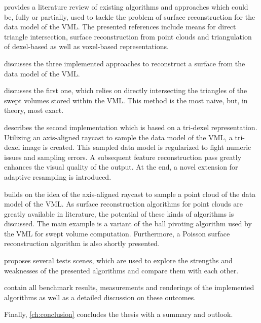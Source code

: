  provides a literature review of existing algorithms and approaches which could be, fully or partially, used to tackle the problem of surface reconstruction for the data model of the VML.
The presented references include means for direct triangle intersection, surface reconstruction from point clouds and triangulation of dexel-based as well as voxel-based representations.

 discusses the three implemented approaches to reconstruct a surface from the data model of the VML.

 discusses the first one, which relies on directly intersecting the triangles of the swept volumes stored within the VML.
This method is the most naive, but, in theory, most exact.

 describes the second implementation which is based on a tri-dexel representation.
Utilizing an axis-aligned raycast to sample the data model of the VML, a tri-dexel image is created.
This sampled data model is regularized to fight numeric issues and sampling errors.
A subsequent feature reconstruction pass greatly enhances the visual quality of the output.
At the end, a novel extension for adaptive resampling is introduced.

 builds on the idea of the axis-aligned raycast to sample a point cloud of the data model of the VML.
As surface reconstruction algorithms for point clouds are greatly available in literature, the potential of these kinds of algorithms is discussed.
The main example is a variant of the ball pivoting algorithm used by the VML for swept volume computation.
Furthermore, a Poisson surface reconstruction algorithm is also shortly presented.

 proposes several tests scenes, which are used to explore the strengths and weaknesses of the presented algorithms and compare them with each other.

 contain all benchmark results, measurements and renderings of the implemented algorithms as well as a detailed discussion on these outcomes.

Finally, \cref{ch:conclusion} concludes the thesis with a summary and outlook.
